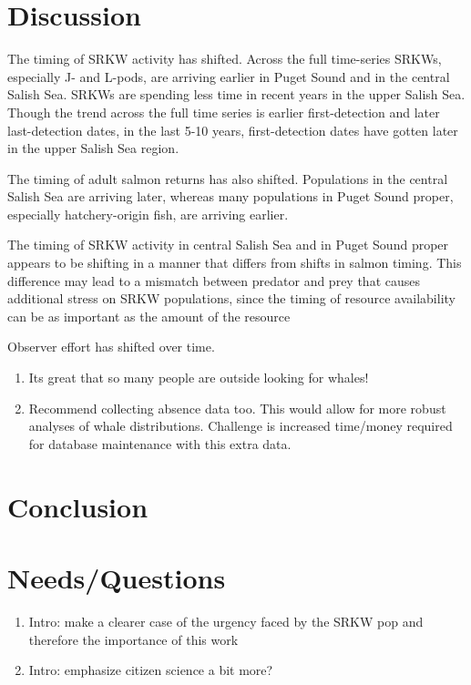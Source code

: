 \documentclass{article}
\begin{document}
\section*{Discussion}
\par The timing of SRKW activity has shifted. Across the full time-series SRKWs, especially J- and L-pods, are arriving earlier in Puget Sound and in the central Salish Sea. SRKWs are spending less time in recent years in the upper Salish Sea. Though the trend across the full time series is earlier first-detection and later last-detection dates, in the last 5-10 years, first-detection dates have gotten later in the upper Salish Sea region.
\par The timing of adult salmon returns has also shifted. Populations in the central Salish Sea are arriving later, whereas many populations in Puget Sound proper, especially hatchery-origin fish, are arriving earlier. 
\par The timing of SRKW activity in central Salish Sea and in Puget Sound proper appears to be shifting in a manner that differs from shifts in salmon timing. This difference may lead to a mismatch between predator and prey that causes additional stress on SRKW populations, since the timing of resource availability can be as important as the amount of the resource \citep[Brianna's work,][]{hipfner2008}
\par Observer effort has shifted over time. 
\begin{enumerate}
\item Its great that so many people are outside looking for whales!
\item Recommend collecting absence data too. This would allow for more robust analyses of whale distributions. Challenge is increased time/money required for database maintenance with this extra data.
\end{enumerate}

\section*{Conclusion}

\section*{Needs/Questions}

\begin{enumerate}
\item Intro: make a clearer case of the urgency faced by the SRKW pop and therefore the importance of this work
\item Intro: emphasize citizen science a bit more?

\end{enumerate}
\end{document}

